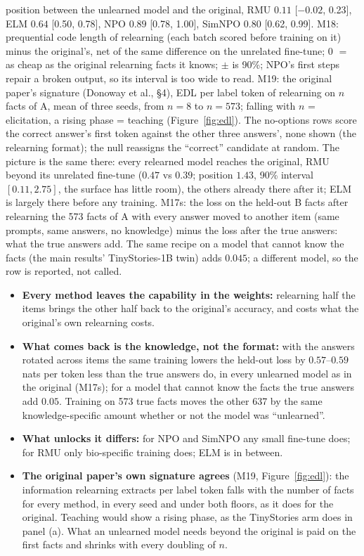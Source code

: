\documentclass[11pt]{article}
\newenvironment{steps}{\begin{itemize}[nosep,leftmargin=1.2em,topsep=2pt]}{\end{itemize}}
\begin{document}
\begin{table}[!htbp]
{position between the unlearned model and the original, RMU $0.11$ [$-0.02$, 0.23], ELM $0.64$ [0.50,
0.78], NPO $0.89$ [0.78, 1.00], SimNPO $0.80$ [0.62, 0.99]. M18: prequential code length of
relearning (each batch scored before training on it) minus the original's, net of the same
difference on the unrelated fine-tune; 0 $=$ as cheap as the original relearning facts it knows;
$\pm$ is 90\%; NPO's first steps repair a broken output, so its interval is too wide to read.
M19: the original paper's signature (Donoway et al., \S4), EDL per label token of relearning on
$n$ facts of A, mean of three seeds, from $n=8$ to $n=573$; falling with $n$ = elicitation, a rising
phase = teaching (Figure~\ref{fig:edl}). The no-options rows score the correct
answer's first token against the other three answers', none shown (the relearning format); the null
reassigns the ``correct'' candidate at random. The picture is the same there: every relearned model
reaches the original, RMU beyond its unrelated fine-tune ($0.47$ vs $0.39$; position $1.43$, 90\%
interval $[0.11, 2.75]$, the surface has little room), the others already there after it; ELM is
largely there before any training. M17s: the loss on the held-out B facts after relearning the 573
facts of A with every answer moved to another item (same prompts, same answers, no knowledge) minus
the loss after the true answers: what the true answers add. The same recipe on a model that cannot
know the facts (the main results' TinyStories-1B twin) adds $0.045$; a different model, so the row
is reported, not called.}
\label{tab:headline}
\end{table}

\begin{steps}
\item \textbf{Every method leaves the capability in the weights:} relearning half the items brings
the other half back to the original's accuracy, and costs what the original's own relearning costs.
\item \textbf{What comes back is the knowledge, not the format:} with the answers rotated across
items the same training lowers the held-out loss by $0.57$--$0.59$ nats per token less than the
true answers do, in every unlearned model as in the original (M17s); for a model that cannot know
the facts the true answers add $0.05$. Training on 573 true facts moves the other 637 by the same
knowledge-specific amount whether or not the model was ``unlearned''.
\item \textbf{What unlocks it differs:} for NPO and SimNPO any small fine-tune does; for RMU only
bio-specific training does; ELM is in between.
\item \textbf{The original paper's own signature agrees} (M19, Figure~\ref{fig:edl}): the
information relearning extracts per label token falls with the number of facts for every method,
in every seed and under both floors, as it does for the original. Teaching would show a rising
phase, as the TinyStories arm does in panel (a). What an unlearned model needs beyond the original
is paid on the first facts and shrinks with every doubling of $n$.
\end{steps}
\end{document}
